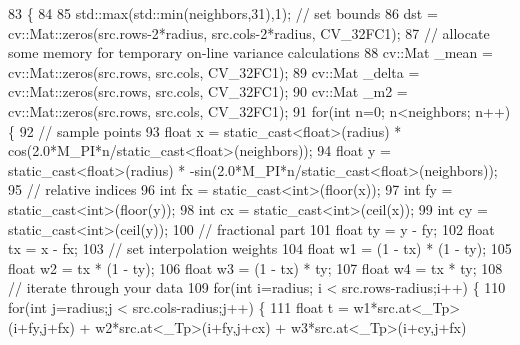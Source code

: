 \begin{DoxyCode}
83                                                                          \{
84     
85     std::max(std::min(neighbors,31),1); \textcolor{comment}{// set bounds}
86     dst = cv::Mat::zeros(src.rows-2*radius, src.cols-2*radius, CV\_32FC1); 
87     \textcolor{comment}{// allocate some memory for temporary on-line variance calculations}
88     cv::Mat \_mean = cv::Mat::zeros(src.rows, src.cols, CV\_32FC1);
89     cv::Mat \_delta = cv::Mat::zeros(src.rows, src.cols, CV\_32FC1);
90     cv::Mat \_m2 = cv::Mat::zeros(src.rows, src.cols, CV\_32FC1);
91     \textcolor{keywordflow}{for}(\textcolor{keywordtype}{int} n=0; n<neighbors; n++) \{
92         \textcolor{comment}{// sample points}
93         \textcolor{keywordtype}{float} x = \textcolor{keyword}{static\_cast<}\textcolor{keywordtype}{float}\textcolor{keyword}{>}(radius) * cos(2.0*M\_PI*n/static\_cast<float>(neighbors));
94         \textcolor{keywordtype}{float} y = \textcolor{keyword}{static\_cast<}\textcolor{keywordtype}{float}\textcolor{keyword}{>}(radius) * -sin(2.0*M\_PI*n/static\_cast<float>(neighbors));
95         \textcolor{comment}{// relative indices}
96         \textcolor{keywordtype}{int} fx = \textcolor{keyword}{static\_cast<}\textcolor{keywordtype}{int}\textcolor{keyword}{>}(floor(x));
97         \textcolor{keywordtype}{int} fy = \textcolor{keyword}{static\_cast<}\textcolor{keywordtype}{int}\textcolor{keyword}{>}(floor(y));
98         \textcolor{keywordtype}{int} cx = \textcolor{keyword}{static\_cast<}\textcolor{keywordtype}{int}\textcolor{keyword}{>}(ceil(x));
99         \textcolor{keywordtype}{int} cy = \textcolor{keyword}{static\_cast<}\textcolor{keywordtype}{int}\textcolor{keyword}{>}(ceil(y));
100         \textcolor{comment}{// fractional part}
101         \textcolor{keywordtype}{float} ty = y - fy;
102         \textcolor{keywordtype}{float} tx = x - fx;
103         \textcolor{comment}{// set interpolation weights}
104         \textcolor{keywordtype}{float} w1 = (1 - tx) * (1 - ty);
105         \textcolor{keywordtype}{float} w2 =      tx  * (1 - ty);
106         \textcolor{keywordtype}{float} w3 = (1 - tx) *      ty;
107         \textcolor{keywordtype}{float} w4 =      tx  *      ty;
108         \textcolor{comment}{// iterate through your data}
109         \textcolor{keywordflow}{for}(\textcolor{keywordtype}{int} i=radius; i < src.rows-radius;i++) \{
110             \textcolor{keywordflow}{for}(\textcolor{keywordtype}{int} j=radius;j < src.cols-radius;j++) \{
111                 \textcolor{keywordtype}{float} t = w1*src.at<\_Tp>(i+fy,j+fx) + w2*src.at<\_Tp>(i+fy,j+cx) + w3*src.at<\_Tp>(i+cy,j+fx)

\end{DoxyCode}
